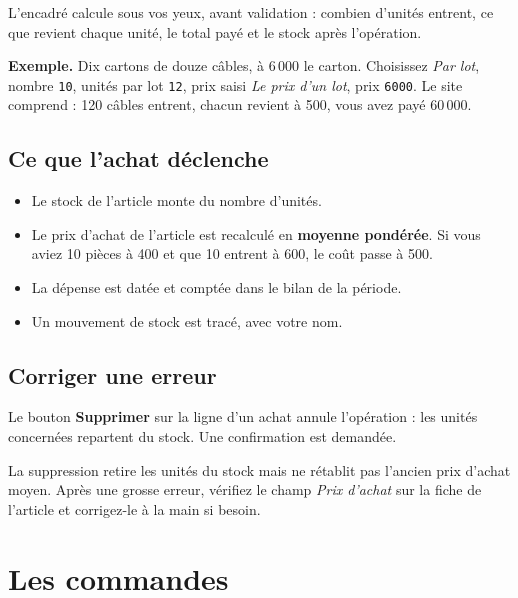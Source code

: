 \documentclass[11pt,a4paper]{article}
\newcommand{\bouton}[1]{\textbf{\textcolor{sig}{#1}}}
\newcommand{\champ}[1]{\textit{#1}}
\begin{document}
L'encadré calcule sous vos yeux, avant validation : combien d'unités entrent,
ce que revient chaque unité, le total payé et le stock après l'opération.

\begin{conseil}
\textbf{Exemple.} Dix cartons de douze câbles, à 6\,000 le carton. Choisissez
\textit{Par lot}, nombre \texttt{10}, unités par lot \texttt{12}, prix saisi
\textit{Le prix d'un lot}, prix \texttt{6000}. Le site comprend : 120 câbles
entrent, chacun revient à 500, vous avez payé 60\,000.
\end{conseil}

\subsection{Ce que l'achat déclenche}

\begin{itemize}
  \item Le stock de l'article monte du nombre d'unités.
  \item Le prix d'achat de l'article est recalculé en \textbf{moyenne pondérée}.
        Si vous aviez 10 pièces à 400 et que 10 entrent à 600, le coût passe à 500.
  \item La dépense est datée et comptée dans le bilan de la période.
  \item Un mouvement de stock est tracé, avec votre nom.
\end{itemize}

\subsection{Corriger une erreur}

Le bouton \bouton{Supprimer} sur la ligne d'un achat annule l'opération : les
unités concernées repartent du stock. Une confirmation est demandée.

\begin{attention}
La suppression retire les unités du stock mais ne rétablit pas l'ancien prix
d'achat moyen. Après une grosse erreur, vérifiez le champ \champ{Prix d'achat}
sur la fiche de l'article et corrigez-le à la main si besoin.
\end{attention}

\section{Les commandes}
\end{document}

